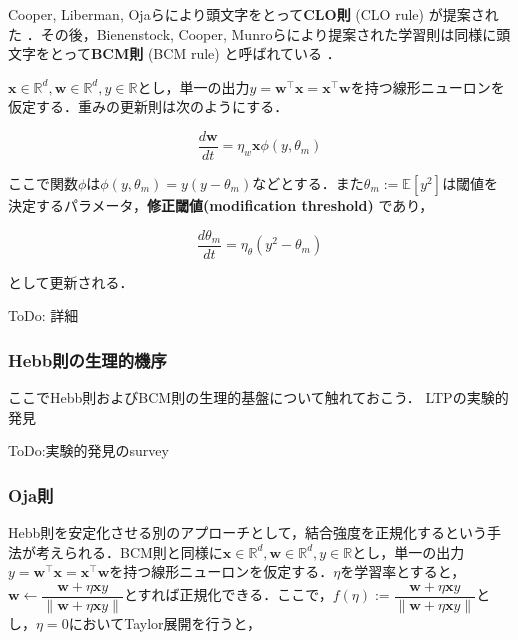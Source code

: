Cooper, Liberman, Ojaらにより頭文字をとって\textbf{CLO則} (CLO rule) が提案された \cite{Cooper1979-wz}．その後，Bienenstock, Cooper, Munroらにより提案された学習則は同様に頭文字をとって\textbf{BCM則} (BCM rule) と呼ばれている\cite{Bienenstock1982-km} \cite{Cooper2012-ec}．

$\mathbf{x}\in \mathbb{R}^d, \mathbf{w}\in \mathbb{R}^d, y\in \mathbb{R}$とし，単一の出力$y = \mathbf{w}^\top \mathbf{x}=\mathbf{x}^\top \mathbf{w}$を持つ線形ニューロンを仮定する．重みの更新則は次のようにする．


\begin{equation}
\frac{d\mathbf{w}}{dt} = \eta_w \mathbf{x} \phi(y, \theta_m)
\end{equation}


ここで関数$\phi$は$\phi(y, \theta_m)=y(y-\theta_m)$などとする．また$\theta_m:=\mathbb{E}[y^2]$は閾値を決定するパラメータ，\textbf{修正閾値(modification threshold)} であり，


\begin{equation}
\frac{d\theta_m}{dt} = \eta_{\theta} \left(y^2-\theta_m\right)
\end{equation}


として更新される．

ToDo: 詳細




\subsubsection{Hebb則の生理的機序}
ここでHebb則およびBCM則の生理的基盤について触れておこう．
LTPの実験的発見 \cite{Bliss1973-vj} \cite{Dudek1992-nz}

ToDo:実験的発見のsurvey
\subsubsection{Oja則}
Hebb則を安定化させる別のアプローチとして，結合強度を正規化するという手法が考えられる．BCM則と同様に$\mathbf{x}\in \mathbb{R}^d, \mathbf{w}\in \mathbb{R}^d, y\in \mathbb{R}$とし，単一の出力$y = \mathbf{w}^\top \mathbf{x}=\mathbf{x}^\top \mathbf{w}$を持つ線形ニューロンを仮定する．$\eta$を学習率とすると，$\mathbf{w}\leftarrow\dfrac{\mathbf{w}+\eta \mathbf{x}y}{\|\mathbf{w}+\eta \mathbf{x}y\|}$とすれば正規化できる．ここで，$f(\eta):=\dfrac{\mathbf{w}+\eta \mathbf{x}y}{\|\mathbf{w}+\eta \mathbf{x}y\|}$とし，$\eta=0$においてTaylor展開を行うと，


